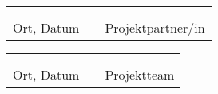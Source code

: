 \vspace*{1cm}

\begin{tabular}{cp{2em}c} 
   \hspace{4cm}        & & \hspace{6cm} \\\cline{1-1}\cline{3-3}
                       & & \\[-3mm]
   {\footnotesize Ort, Datum }  & & {\footnotesize Projektpartner/in }
\end{tabular}

\vspace*{1cm}

\begin{tabular}{cp{2em}c} 
   \hspace{4cm}        & & \hspace{6cm} \\\cline{1-1}\cline{3-3}
                       & & \\[-3mm]
   {\footnotesize Ort, Datum }  & & {\footnotesize Projektteam }
\end{tabular}